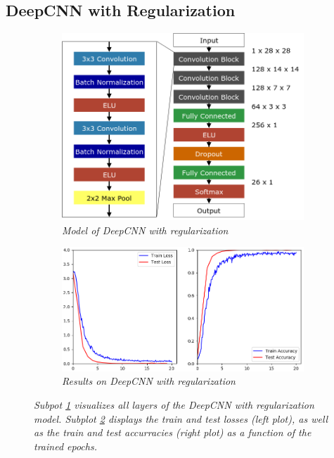 \documentclass[a4paper]{article}
\begin{document}
\subsection{DeepCNN with Regularization}\label{sec:deepCNN_regularized}
\begin{figure}
    \centering
    \hspace{-1cm}
    \begin{subfigure}[b]{0.4\textwidth}
        \includegraphics[height=0.25\paperwidth]{graphics/nets/CNN13_with_BN}
        \caption{\textit{Model of DeepCNN with regularization}}
        \label{fig:deepCNN_regularized_model}
    \end{subfigure}
    \begin{subfigure}[b]{0.5\textwidth}
        \includegraphics[height=0.25\paperwidth]{graphics/nets/CNN13_with_BN_Results}
        \caption{\textit{Results on DeepCNN with regularization}}
        \label{fig:deepCNN_regularized_results}
    \end{subfigure}
    \caption{\textit{Subpot \ref{fig:deepCNN_regularized_model} visualizes all layers of the DeepCNN with regularization model. Subplot \ref{fig:deepCNN_regularized_results} displays the train and test losses (left plot), as well as the train and test accurracies (right plot) as a function of the trained epochs.}}\label{fig:deepCNN_regularized}
\end{figure}
\end{document}
